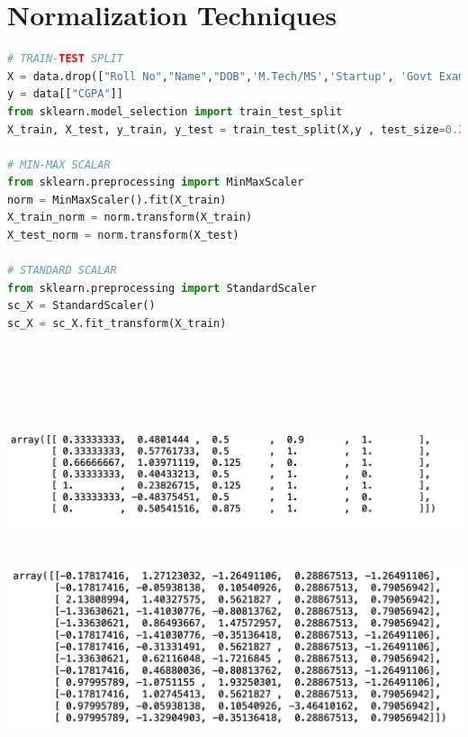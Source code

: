 \documentclass{article}
\begin{document}
\section{Normalization Techniques}
\begin{lstlisting}[language=Python]
# TRAIN-TEST SPLIT
X = data.drop(["Roll No","Name","DOB",'M.Tech/MS','Startup', 'Govt Exams'],axis=1)
y = data[["CGPA"]]
from sklearn.model_selection import train_test_split
X_train, X_test, y_train, y_test = train_test_split(X,y , test_size=0.33, random_state=42)

# MIN-MAX SCALAR
from sklearn.preprocessing import MinMaxScaler
norm = MinMaxScaler().fit(X_train)
X_train_norm = norm.transform(X_train)
X_test_norm = norm.transform(X_test)

# STANDARD SCALAR
from sklearn.preprocessing import StandardScaler
sc_X = StandardScaler()
sc_X = sc_X.fit_transform(X_train)

    
\end{lstlisting}\\\\\
\includegraphics[scale=0.75]{images/nine.png}\\\\\\
\includegraphics[scale=0.75]{images/eight.png}
\end{document}
